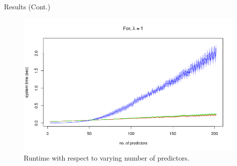 \documentclass[tikz]{beamer}					%
\begin{document}
{
\begin{frame}{Results (Cont.)}
\begin{figure}
    \centering
    \includegraphics[width=0.7\paperwidth]{figures/pred.png}
    \caption{Runtime with respect to varying number of predictors.}
\end{figure}
\end{frame}
}
\end{document}
